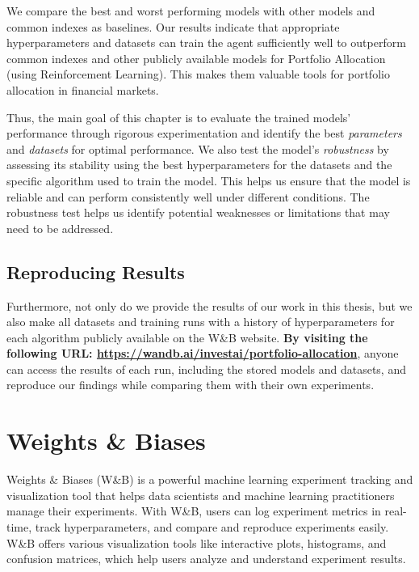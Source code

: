 \documentclass[../xlapes02]{subfiles}
\begin{document}
    We compare the best and worst performing models with other models and common indexes as baselines. Our results indicate that appropriate hyperparameters and datasets can train the agent sufficiently well to outperform common indexes and other publicly available models for Portfolio Allocation (using Reinforcement Learning). This makes them valuable tools for portfolio allocation in financial markets.

    Thus, the main goal of this chapter is to evaluate the trained models' performance through rigorous experimentation and identify the best \emph{parameters} and \emph{datasets} for optimal performance. We also test the model's \emph{robustness} by assessing its stability using the best hyperparameters for the datasets and the specific algorithm used to train the model. This helps us ensure that the model is reliable and can perform consistently well under different conditions. The robustness test helps us identify potential weaknesses or limitations that may need to be addressed.

    \subsection{Reproducing Results}
    Furthermore, not only do we provide the results of our work in this thesis, but we also make all datasets and training runs with a history of hyperparameters for each algorithm publicly available on the W\&B website. \textbf{By visiting the following URL: \url{https://wandb.ai/investai/portfolio-allocation}}, anyone can access the results of each run, including the stored models and datasets, and reproduce our findings while comparing them with their own experiments.


    \section{Weights \& Biases}\label{sec:wandb}
    Weights \& Biases (W\&B) is a powerful machine learning experiment tracking and visualization tool that helps data scientists and machine learning practitioners manage their experiments. With W\&B, users can log experiment metrics in real-time, track hyperparameters, and compare and reproduce experiments easily. W\&B offers various visualization tools like interactive plots, histograms, and confusion matrices, which help users analyze and understand experiment results.
\end{document}
